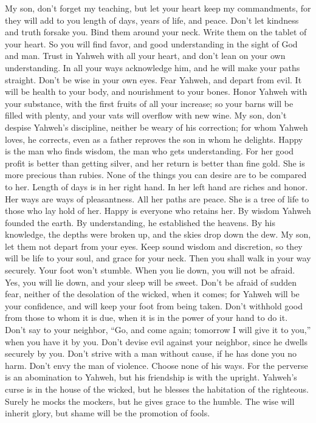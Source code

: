  My son, don't forget my teaching, but let your heart keep
my commandments,  for they will add to you length of days,
years of life, and peace.  Don't let kindness and truth
forsake you. Bind them around your neck. Write them on the tablet of
your heart.  So you will find favor, and good understanding
in the sight of God and man.  Trust in Yahweh with all your
heart, and don't lean on your own understanding.  In all
your ways acknowledge him, and he will make your paths straight.
 Don't be wise in your own eyes. Fear Yahweh, and depart
from evil.  It will be health to your body, and nourishment
to your bones.  Honor Yahweh with your substance, with the
first fruits of all your increase;  so your barns will be
filled with plenty, and your vats will overflow with new wine.
 My son, don't despise Yahweh's discipline, neither be
weary of his correction;  for whom Yahweh loves, he
corrects, even as a father reproves the son in whom he delights.
 Happy is the man who finds wisdom, the man who gets
understanding.  For her good profit is better than getting
silver, and her return is better than fine gold.  She is
more precious than rubies. None of the things you can desire are to be
compared to her.  Length of days is in her right hand. In
her left hand are riches and honor.  Her ways are ways of
pleasantness. All her paths are peace.  She is a tree of
life to those who lay hold of her. Happy is everyone who retains her.
 By wisdom Yahweh founded the earth. By understanding, he
established the heavens.  By his knowledge, the depths were
broken up, and the skies drop down the dew.  My son, let
them not depart from your eyes. Keep sound wisdom and discretion,
 so they will be life to your soul, and grace for your
neck.  Then you shall walk in your way securely. Your foot
won't stumble.  When you lie down, you will not be afraid.
Yes, you will lie down, and your sleep will be sweet. 
Don't be afraid of sudden fear, neither of the desolation of the wicked,
when it comes;  for Yahweh will be your confidence, and
will keep your foot from being taken.  Don't withhold good
from those to whom it is due, when it is in the power of your hand to do
it.  Don't say to your neighbor, ``Go, and come again;
tomorrow I will give it to you,'' when you have it by you. 
Don't devise evil against your neighbor, since he dwells securely by
you.  Don't strive with a man without cause, if he has done
you no harm.  Don't envy the man of violence. Choose none
of his ways.  For the perverse is an abomination to Yahweh,
but his friendship is with the upright.  Yahweh's curse is
in the house of the wicked, but he blesses the habitation of the
righteous.  Surely he mocks the mockers, but he gives grace
to the humble.  The wise will inherit glory, but shame will
be the promotion of fools.

